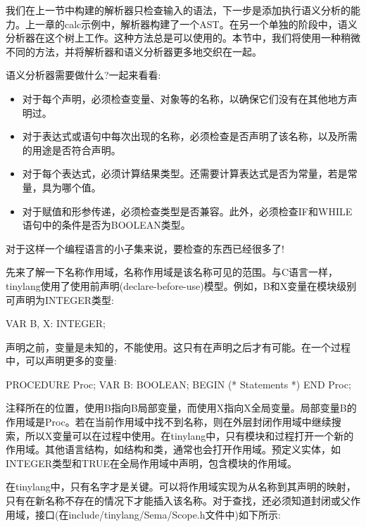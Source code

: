 
我们在上一节中构建的解析器只检查输入的语法，下一步是添加执行语义分析的能力。上一章的calc示例中，解析器构建了一个AST。在另一个单独的阶段中，语义分析器在这个树上工作。这种方法总是可以使用的。本节中，我们将使用一种稍微不同的方法，并将解析器和语义分析器更多地交织在一起。

语义分析器需要做什么?一起来看看:

\begin{itemize}
\item
对于每个声明，必须检查变量、对象等的名称，以确保它们没有在其他地方声明过。

\item
对于表达式或语句中每次出现的名称，必须检查是否声明了该名称，以及所需的用途是否符合声明。

\item
对于每个表达式，必须计算结果类型。还需要计算表达式是否为常量，若是常量，具为哪个值。

\item
对于赋值和形参传递，必须检查类型是否兼容。此外，必须检查IF和WHILE语句中的条件是否为BOOLEAN类型。
\end{itemize}

对于这样一个编程语言的小子集来说，要检查的东西已经很多了!


先来了解一下名称作用域，名称作用域是该名称可见的范围。与C语言一样，tinylang使用了使用前声明(declare-before-use)模型。例如，B和X变量在模块级别可声明为INTEGER类型:

\begin{shell}
VAR B, X: INTEGER;
\end{shell}

声明之前，变量是未知的，不能使用。这只有在声明之后才有可能。在一个过程中，可以声明更多的变量:

\begin{shell}
PROCEDURE Proc;
VAR B: BOOLEAN;
BEGIN
    (* Statements *)
END Proc;
\end{shell}

注释所在的位置，使用B指向B局部变量，而使用X指向X全局变量。局部变量B的作用域是Proc。若在当前作用域中找不到名称，则在外层封闭作用域中继续搜索，所以X变量可以在过程中使用。在tinylang中，只有模块和过程打开一个新的作用域。其他语言结构，如结构和类，通常也会打开作用域。预定义实体，如INTEGER类型和TRUE在全局作用域中声明，包含模块的作用域。

在tinylang中，只有名字才是关键。可以将作用域实现为从名称到其声明的映射，只有在新名称不存在的情况下才能插入该名称。对于查找，还必须知道封闭或父作用域，接口(在include/tinylang/Sema/Scope.h文件中)如下所示:

